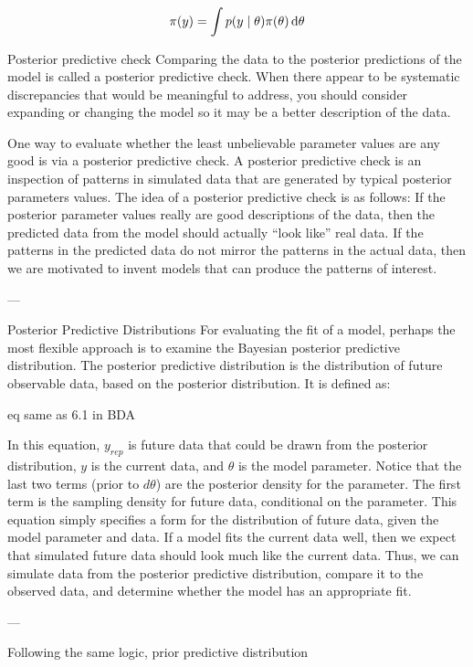 \begin{equation}\label{eq:prior_predictive}
    \pi (y) = \int p \qty(y \mid \theta) \pi \qty(\theta) \dd{\theta}
\end{equation}


Posterior predictive check
Comparing the data to the posterior predictions of the model is called a posterior predictive check. When there appear to be systematic discrepancies that would be meaningful to address, you should consider expanding or changing the model so it may be a better description of the data.

One way to evaluate whether the least unbelievable parameter values are any good is via a posterior predictive check. A posterior predictive check is an inspection of patterns in simulated data that are generated by typical posterior parameters values. The idea of a posterior predictive check is as follows: If the posterior parameter values really are good descriptions of the data, then the predicted data from the model should actually “look like” real data. If the patterns in the predicted data do not mirror the patterns in the actual data, then we are motivated to invent models that can produce the patterns of interest.

---

Posterior Predictive Distributions
For evaluating the fit of a model, perhaps the most flexible approach is to examine the Bayesian posterior predictive distribution. The posterior predictive distribution is the distribution of future observable data, based on the posterior distribution. It is defined as: 

eq same as 6.1 in BDA 

In this equation, $y_{rep}$ is future data that could be drawn from the posterior distribution, $y$ is the current data, and $\theta$ is the model parameter. Notice that the last two terms (prior to $d\theta$) are the posterior density for the parameter. The first term is the sampling density for future data, conditional on the parameter. This equation simply specifies a form for the distribution of future data, given the model parameter and data. If a model fits the current data well, then we expect that simulated future data should look much like the current data. Thus, we can simulate data from the posterior predictive distribution, compare it to the observed data, and determine whether the model has an appropriate fit. 

---

Following the same logic, prior predictive distribution  


